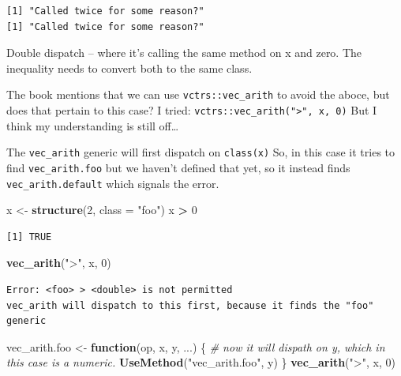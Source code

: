 \documentclass[]{book}
\newenvironment{Shaded}{\begin{snugshade}}{\end{snugshade}}
\newcommand{\CommentTok}[1]{\textcolor[rgb]{0.56,0.35,0.01}{\textit{#1}}}
\newcommand{\ControlFlowTok}[1]{\textcolor[rgb]{0.13,0.29,0.53}{\textbf{#1}}}
\newcommand{\DataTypeTok}[1]{\textcolor[rgb]{0.13,0.29,0.53}{#1}}
\newcommand{\DecValTok}[1]{\textcolor[rgb]{0.00,0.00,0.81}{#1}}
\newcommand{\KeywordTok}[1]{\textcolor[rgb]{0.13,0.29,0.53}{\textbf{#1}}}
\newcommand{\NormalTok}[1]{#1}
\newcommand{\OperatorTok}[1]{\textcolor[rgb]{0.81,0.36,0.00}{\textbf{#1}}}
\newcommand{\StringTok}[1]{\textcolor[rgb]{0.31,0.60,0.02}{#1}}
\begin{document}
\begin{verbatim}
[1] "Called twice for some reason?"
[1] "Called twice for some reason?"
\end{verbatim}

Double dispatch -- where it's calling the same method on x and zero. The inequality needs to convert both to the same class.

The book mentions that we can use \texttt{vctrs::vec\_arith} to avoid the aboce, but does that pertain to this case? I tried: \texttt{vctrs::vec\_arith("\textgreater{}",\ x,\ 0)} But I think my understanding is still off\ldots{}

The \texttt{vec\_arith} generic will first dispatch on \texttt{class(x)} So, in this case it tries to find \texttt{vec\_arith.foo} but we haven't defined that yet, so it instead finds \texttt{vec\_arith.default} which signals the error.

\begin{Shaded}
\begin{Highlighting}[]
\NormalTok{x <-}\StringTok{ }\KeywordTok{structure}\NormalTok{(}\DecValTok{2}\NormalTok{, }\DataTypeTok{class =} \StringTok{"foo"}\NormalTok{)}
\NormalTok{x }\OperatorTok{>}\StringTok{ }\DecValTok{0}
\end{Highlighting}
\end{Shaded}

\begin{verbatim}
[1] TRUE
\end{verbatim}

\begin{Shaded}
\begin{Highlighting}[]
\KeywordTok{vec_arith}\NormalTok{(}\StringTok{">"}\NormalTok{, x, }\DecValTok{0}\NormalTok{) }
\end{Highlighting}
\end{Shaded}

\begin{verbatim}
Error: <foo> > <double> is not permitted
vec_arith will dispatch to this first, because it finds the "foo" generic
\end{verbatim}

\begin{Shaded}
\begin{Highlighting}[]
\NormalTok{vec_arith.foo <-}\StringTok{ }\ControlFlowTok{function}\NormalTok{(op, x, y, ...) \{}
  \CommentTok{# now it will dispath on y, which in this case is a numeric.}
  \KeywordTok{UseMethod}\NormalTok{(}\StringTok{"vec_arith.foo"}\NormalTok{, y)}
\NormalTok{\}}
\KeywordTok{vec_arith}\NormalTok{(}\StringTok{">"}\NormalTok{, x, }\DecValTok{0}\NormalTok{) }
\end{Highlighting}
\end{Shaded}
\end{document}

